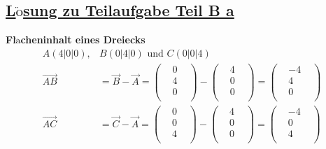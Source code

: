 \documentclass[a4 paper, 12pt]{report}
\theoremstyle{plain}
\begin{document}
\subsection*{\underline{L$\ddot{\mbox{o}}$sung zu Teilaufgabe Teil B a}}
\textbf{\large Fl$\ddot{\mbox{a}}$cheninhalt eines Dreiecks}
\begin{align*}
A(4|0|0),& B(0|4|0) \mbox{  und  } C(0|0|4)\\
\stackrel{\longrightarrow}{AB}& = \stackrel{\longrightarrow}{B}-\stackrel{\longrightarrow}{A} = 
\begin{pmatrix}
&0&\\
&4&\\
&0&\\
\end{pmatrix}
-
\begin{pmatrix}
&4&\\
&0&\\
&0&\\
\end{pmatrix}
=
\begin{pmatrix}
&-4&\\
&4&\\
&0&\\
\end{pmatrix}\\
\stackrel{\longrightarrow}{AC}& = \stackrel{\longrightarrow}{C}-\stackrel{\longrightarrow}{A} = 
\begin{pmatrix}
&0&\\
&0&\\
&4&\\
\end{pmatrix}
-
\begin{pmatrix}
&4&\\
&0&\\
&0&\\
\end{pmatrix}
=
\begin{pmatrix}
&-4&\\
&0&\\
&4&\\
\end{pmatrix}
\end{align*}
\end{document}
